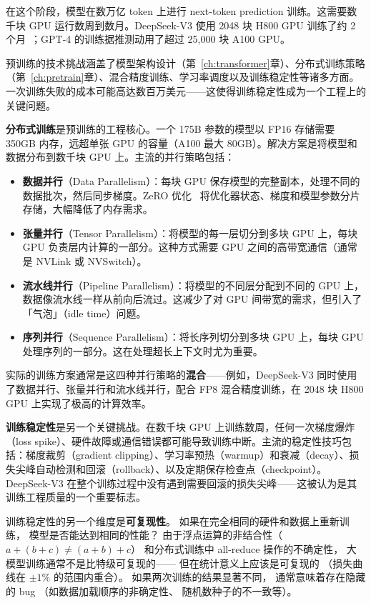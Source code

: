 在这个阶段，模型在数万亿 token 上进行 next-token prediction 训练。这需要数千块 GPU 运行数周到数月。DeepSeek-V3 使用 2048 块 H800 GPU 训练了约 2 个月~\cite{deepseekv3}；GPT-4 的训练据推测动用了超过 25,000 块 A100 GPU。

预训练的技术挑战涵盖了模型架构设计（第~\ref{ch:transformer}章）、分布式训练策略（第~\ref{ch:pretrain}章）、混合精度训练、学习率调度以及训练稳定性等诸多方面。一次训练失败的成本可能高达数百万美元——这使得训练稳定性成为一个工程上的关键问题。

\textbf{分布式训练}是预训练的工程核心。一个 175B 参数的模型以 FP16 存储需要 350GB 内存，远超单张 GPU 的容量（A100 最大 80GB）。解决方案是将模型和数据分布到数千块 GPU 上。主流的并行策略包括：
\begin{itemize}[noitemsep]
  \item \textbf{数据并行}（Data Parallelism）：每块 GPU 保存模型的完整副本，处理不同的数据批次，然后同步梯度。ZeRO 优化~\cite{rajbhandari2020zero} 将优化器状态、梯度和模型参数分片存储，大幅降低了内存需求。
  \item \textbf{张量并行}（Tensor Parallelism）：将模型的每一层切分到多块 GPU 上，每块 GPU 负责层内计算的一部分。这种方式需要 GPU 之间的高带宽通信（通常是 NVLink 或 NVSwitch）。
  \item \textbf{流水线并行}（Pipeline Parallelism）：将模型的不同层分配到不同的 GPU 上，数据像流水线一样从前向后流过。这减少了对 GPU 间带宽的需求，但引入了「气泡」（idle time）问题。
  \item \textbf{序列并行}（Sequence Parallelism）：将长序列切分到多块 GPU 上，每块 GPU 处理序列的一部分。这在处理超长上下文时尤为重要。
\end{itemize}

实际的训练方案通常是这四种并行策略的\textbf{混合}——例如，DeepSeek-V3 同时使用了数据并行、张量并行和流水线并行，配合 FP8 混合精度训练，在 2048 块 H800 GPU 上实现了极高的计算效率。

\textbf{训练稳定性}是另一个关键挑战。在数千块 GPU 上训练数周，任何一次梯度爆炸（loss spike）、硬件故障或通信错误都可能导致训练中断。主流的稳定性技巧包括：梯度裁剪（gradient clipping）、学习率预热（warmup）和衰减（decay）、损失尖峰自动检测和回滚（rollback）、以及定期保存检查点（checkpoint）。DeepSeek-V3 在整个训练过程中没有遇到需要回滚的损失尖峰——这被认为是其训练工程质量的一个重要标志。

训练稳定性的另一个维度是\textbf{可复现性}。
如果在完全相同的硬件和数据上重新训练，
模型是否能达到相同的性能？
由于浮点运算的非结合性（$a + (b + c) \neq (a + b) + c$）
和分布式训练中 all-reduce 操作的不确定性，
大模型训练通常不是比特级可复现的——
但在统计意义上应该是可复现的
（损失曲线在 $\pm 1\%$ 的范围内重合）。
如果两次训练的结果显著不同，
通常意味着存在隐藏的 bug
（如数据加载顺序的非确定性、
随机数种子的不一致等）。

